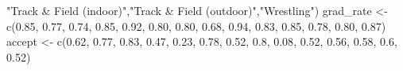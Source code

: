 \documentclass[
]{article}
\newenvironment{Shaded}{\begin{snugshade}}{\end{snugshade}}
\newcommand{\FloatTok}[1]{\textcolor[rgb]{0.00,0.00,0.81}{#1}}
\newcommand{\FunctionTok}[1]{\textcolor[rgb]{0.00,0.00,0.00}{#1}}
\newcommand{\NormalTok}[1]{#1}
\newcommand{\OtherTok}[1]{\textcolor[rgb]{0.56,0.35,0.01}{#1}}
\newcommand{\StringTok}[1]{\textcolor[rgb]{0.31,0.60,0.02}{#1}}
\begin{document}
\begin{Shaded}
\begin{Highlighting}[]
                \StringTok{"Track \& Field (indoor)"}\NormalTok{,}\StringTok{"Track \& Field (outdoor)"}\NormalTok{,}\StringTok{"Wrestling"}\NormalTok{)}
\NormalTok{grad\_rate }\OtherTok{\textless{}{-}} \FunctionTok{c}\NormalTok{(}\FloatTok{0.85}\NormalTok{, }\FloatTok{0.77}\NormalTok{, }\FloatTok{0.74}\NormalTok{, }\FloatTok{0.85}\NormalTok{, }\FloatTok{0.92}\NormalTok{, }\FloatTok{0.80}\NormalTok{, }\FloatTok{0.80}\NormalTok{, }
               \FloatTok{0.68}\NormalTok{, }\FloatTok{0.94}\NormalTok{, }\FloatTok{0.83}\NormalTok{, }\FloatTok{0.85}\NormalTok{, }\FloatTok{0.78}\NormalTok{, }\FloatTok{0.80}\NormalTok{, }\FloatTok{0.87}\NormalTok{)}
\NormalTok{accept }\OtherTok{\textless{}{-}} \FunctionTok{c}\NormalTok{(}\FloatTok{0.62}\NormalTok{, }\FloatTok{0.77}\NormalTok{, }\FloatTok{0.83}\NormalTok{, }\FloatTok{0.47}\NormalTok{, }\FloatTok{0.23}\NormalTok{, }\FloatTok{0.78}\NormalTok{, }\FloatTok{0.52}\NormalTok{, }
            \FloatTok{0.8}\NormalTok{, }\FloatTok{0.08}\NormalTok{, }\FloatTok{0.52}\NormalTok{, }\FloatTok{0.56}\NormalTok{, }\FloatTok{0.58}\NormalTok{, }\FloatTok{0.6}\NormalTok{, }\FloatTok{0.52}\NormalTok{)}


\end{Highlighting}
\end{Shaded}
\end{document}
